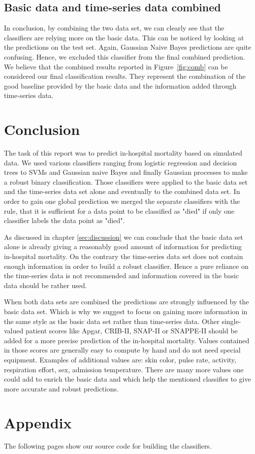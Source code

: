 \documentclass[a4paper,11pt]{article}
\begin{document}
\subsection*{Basic data and time-series data combined}\label{sec:dis_comb_data}
In conclusion, by combining the two data set, we can clearly see that the classifiers are relying more on the basic data. This can be noticed by looking at the predictions on the test set. Again, Gaussian Naive Bayes predictions are quite confusing. Hence, we excluded this classifier from the final combined prediction. We believe that the combined results reported in Figure~\ref{fig:comb} can be considered our final classification results. They represent the combination of the good baseline provided by the basic data and the information added through time-series data.


\section{Conclusion}

The task of this report was to predict in-hospital mortality based on simulated data.
We used various classifiers ranging from logistic regression and decision trees to SVMs and Gaussian naive Bayes and finally Gaussian processes to make a robust binary classification.
Those classifiers were applied to the basic data set and the time-series data set alone and eventually to the combined data set. In order to gain one global prediction we merged the separate classifiers with the rule, that it is sufficient for a data point to be classified as "died" if only one classifier labels the data point as "died".

As discussed in chapter \ref{sec:discussion} we can conclude that the basic data set alone is already giving a reasonably good amount of information for predicting in-hospital mortality. On the contrary the time-series data set does not contain enough information in order to build a robust classifier. Hence a pure reliance on the time-series data is not recommended and information covered in the basic data should be rather used.

When both data sets are combined the predictions are strongly influenced by the basic data set. Which is why we suggest to focus on gaining more information in the same style as the basic data set rather than time-series data. Other single-valued patient scores like Apgar, CRIB-II, SNAP-II or SNAPPE-II should be added for a more precise prediction of the in-hospital mortality. Values contained in those scores are generally easy to compute by hand and do not need special equipment. Examples of additional values are: skin color, pulse rate, activity, respiration effort, sex, admission temperature. There are many more values one could add to enrich the basic data and which help the mentioned classifies to give more accurate and robust predictions. 

%
%

\section{Appendix}
The following pages show our source code for building the classifiers. 
\end{document}
